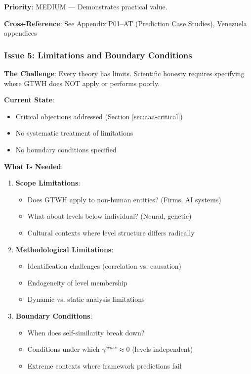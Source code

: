\begin{tcolorbox}[colback=yellow!5!white, colframe=yellow!75!black, title=Status: One Example Only]
\textbf{Priority}: \colorbox{yellow!20}{MEDIUM} --- Demonstrates practical value.

\textbf{Cross-Reference}: See Appendix P01--AT (Prediction Case Studies), Venezuela appendices
\end{tcolorbox}

\subsubsection{Issue 5: Limitations and Boundary Conditions}

\begin{tcolorbox}[colback=yellow!5!white, colframe=yellow!75!black, title=Status: Not Addressed]
\textbf{The Challenge}: Every theory has limits. Scientific honesty requires 
specifying where GTWH does NOT apply or performs poorly.

\textbf{Current State}: 
\begin{itemize}[nosep]
\item Critical objections addressed (Section \ref{sec:aaa-critical})
\item No systematic treatment of limitations
\item No boundary conditions specified
\end{itemize}

\textbf{What Is Needed}:
\begin{enumerate}
\item \textbf{Scope Limitations}:
    \begin{itemize}[nosep]
    \item Does GTWH apply to non-human entities? (Firms, AI systems)
    \item What about levels below individual? (Neural, genetic)
    \item Cultural contexts where level structure differs radically
    \end{itemize}

\item \textbf{Methodological Limitations}:
    \begin{itemize}[nosep]
    \item Identification challenges (correlation vs. causation)
    \item Endogeneity of level membership
    \item Dynamic vs. static analysis limitations
    \end{itemize}

\item \textbf{Boundary Conditions}:
    \begin{itemize}[nosep]
    \item When does self-similarity break down?
    \item Conditions under which $\gamma^{cross} \approx 0$ (levels independent)
    \item Extreme contexts where framework predictions fail
    \end{itemize}


\end{enumerate}
\end{tcolorbox}
